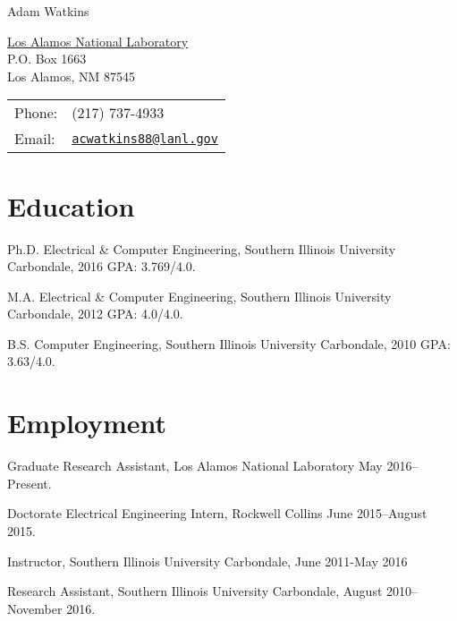 \documentclass[letterpaper]{article}
\def\name{Adam Watkins}
\renewenvironment{itemize}{
  \begin{list}{}{
    \setlength{\leftmargin}{1.5em}
  }
}{
  \end{list}
}
\begin{document}
{\huge \name}


\vspace{0.25in}

\begin{minipage}{0.45\linewidth}
  \href{}{Los Alamos National Laboratory} \\
  P.O. Box 1663  \\
  Los Alamos, NM 87545
\end{minipage}
\begin{minipage}{0.45\linewidth}
  \begin{tabular}{ll}
    Phone: & (217) 737-4933 \\
    Email: & \href{mailto:acwatkins88@lanl.gov}{\tt acwatkins88@lanl.gov} \\
  \end{tabular}
\end{minipage}


\section*{Education}

\begin{itemize}
	
\item Ph.D. Electrical \& Computer Engineering, Southern Illinois University Carbondale, 2016 GPA: 3.769/4.0.
 
\item M.A. Electrical \& Computer Engineering, Southern Illinois University Carbondale, 2012 GPA: 4.0/4.0.

\item B.S. Computer Engineering, Southern Illinois University Carbondale, 2010 GPA: 3.63/4.0.

\end{itemize}


\section*{Employment}

\begin{itemize}
\item Graduate Research Assistant, Los Alamos National Laboratory May 2016--Present.
\item Doctorate Electrical Engineering Intern, Rockwell Collins June 2015--August 2015.
\item Instructor, Southern Illinois University Carbondale, June 2011-May 2016
\item Research Assistant, Southern Illinois University Carbondale, August 2010--November 2016.
\end{itemize}
\end{document}
